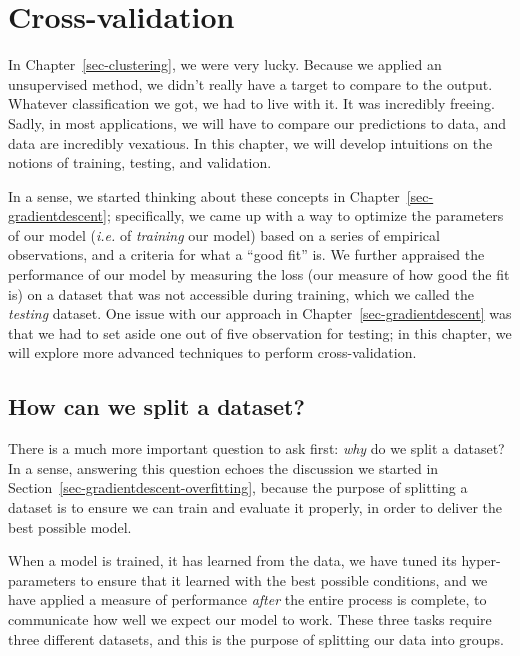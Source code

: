 \documentclass[
  letterpaper,
]{scrbook}
\begin{document}

\chapter{Cross-validation}\label{sec-crossvalidation}

In Chapter~\ref{sec-clustering}, we were very lucky. Because we applied
an unsupervised method, we didn't really have a target to compare to the
output. Whatever classification we got, we had to live with it. It was
incredibly freeing. Sadly, in most applications, we will have to compare
our predictions to data, and data are incredibly vexatious. In this
chapter, we will develop intuitions on the notions of training, testing,
and validation.

In a sense, we started thinking about these concepts in
Chapter~\ref{sec-gradientdescent}; specifically, we came up with a way
to optimize the parameters of our model (\emph{i.e.} of \emph{training}
our model) based on a series of empirical observations, and a criteria
for what a ``good fit'' is. We further appraised the performance of our
model by measuring the loss (our measure of how good the fit is) on a
dataset that was not accessible during training, which we called the
\emph{testing} dataset. One issue with our approach in
Chapter~\ref{sec-gradientdescent} was that we had to set aside one out
of five observation for testing; in this chapter, we will explore more
advanced techniques to perform cross-validation.

\section{How can we split a dataset?}\label{how-can-we-split-a-dataset}

There is a much more important question to ask first: \emph{why} do we
split a dataset? In a sense, answering this question echoes the
discussion we started in Section~\ref{sec-gradientdescent-overfitting},
because the purpose of splitting a dataset is to ensure we can train and
evaluate it properly, in order to deliver the best possible model.

When a model is trained, it has learned from the data, we have tuned its
hyper-parameters to ensure that it learned with the best possible
conditions, and we have applied a measure of performance \emph{after}
the entire process is complete, to communicate how well we expect our
model to work. These three tasks require three different datasets, and
this is the purpose of splitting our data into groups.
\end{document}
